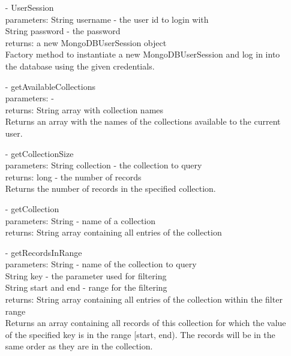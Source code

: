\documentclass[oneside, english, final]{design}
\begin{document}
\begin{itemize}
\begin{itemize}
		      \item[-]UserSession
		            \\parameters: String username - the user id to login with
		            \\String password - the password
		            \\returns: a new MongoDBUserSession object
		            \\Factory method to instantiate a new MongoDBUserSession and log in into the database using the given credentials.

		      \item[-]getAvailableCollections
		            \\parameters: -
		            \\returns: String array with collection names
		            \\Returns an array with the names of the collections available to the current user.

		      \item[-]getCollectionSize
		            \\parameters: String collection - the collection to query
		            \\returns: long - the number of records
		            \\Returns the number of records in the specified collection.

		      \item[-]getCollection
		            \\parameters: String - name of a collection
		            \\returns: String array containing all entries of the collection

		      \item[-]getRecordsInRange
		            \\parameters: String - name of the collection to query
		            \\String key - the parameter used for filtering
		            \\String start and end - range for the filtering
		            \\returns: String array containing all entries of the collection within the filter range
		            \\ Returns an array containing all records of this
		            collection for which the value of the
		            specified key is in the range [start, end).
		            The records will be in the same order as
		            they are in the collection.


\end{itemize}
\end{itemize}
\end{document}
